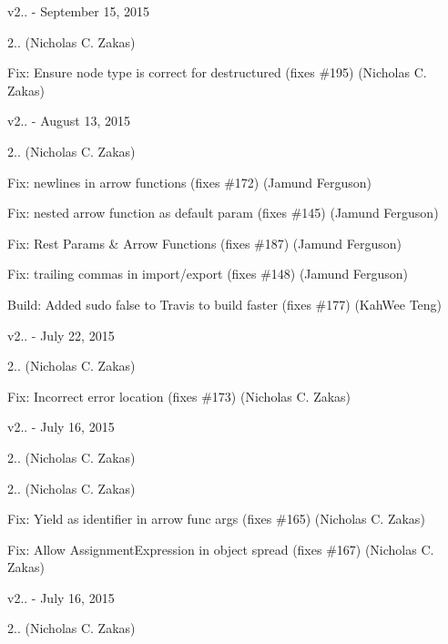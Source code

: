 v2.. -\/ September 15, 2015


\begin{DoxyItemize}
\item 2.. (Nicholas C. Zakas)
\item Fix\+: Ensure node type is correct for destructured (fixes \#195) (Nicholas C. Zakas)
\end{DoxyItemize}

v2.. -\/ August 13, 2015


\begin{DoxyItemize}
\item 2.. (Nicholas C. Zakas)
\item Fix\+: newlines in arrow functions (fixes \#172) (Jamund Ferguson)
\item Fix\+: nested arrow function as default param (fixes \#145) (Jamund Ferguson)
\item Fix\+: Rest Params \& Arrow Functions (fixes \#187) (Jamund Ferguson)
\item Fix\+: trailing commas in import/export (fixes \#148) (Jamund Ferguson)
\item Build\+: Added sudo false to Travis to build faster (fixes \#177) (Kah\+Wee Teng)
\end{DoxyItemize}

v2.. -\/ July 22, 2015


\begin{DoxyItemize}
\item 2.. (Nicholas C. Zakas)
\item Fix\+: Incorrect error location (fixes \#173) (Nicholas C. Zakas)
\end{DoxyItemize}

v2.. -\/ July 16, 2015


\begin{DoxyItemize}
\item 2.. (Nicholas C. Zakas)
\item 2.. (Nicholas C. Zakas)
\item Fix\+: Yield as identifier in arrow func args (fixes \#165) (Nicholas C. Zakas)
\item Fix\+: Allow Assignment\+Expression in object spread (fixes \#167) (Nicholas C. Zakas)
\end{DoxyItemize}

v2.. -\/ July 16, 2015


\begin{DoxyItemize}
\item 2.. (Nicholas C. Zakas)
\end{DoxyItemize}

